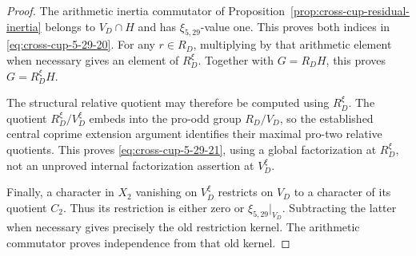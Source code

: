 \begin{proof}
The arithmetic inertia commutator of
Proposition~\ref{prop:cross-cup-residual-inertia} belongs
to \(V_D\cap H\) and has \(\xi_{5,29}\)-value one.
This proves both indices in \eqref{eq:cross-cup-5-29-20}.
For any \(r\in R_D\), multiplying by that arithmetic
element when necessary gives an element of \(R_D^\xi\).
Together with \(G=R_DH\), this proves \(G=R_D^\xi H\).

The structural relative quotient may therefore be
computed using \(R_D^\xi\).
The quotient \(R_D^\xi/V_D^\xi\) embeds into the pro-odd
group \(R_D/V_D\), so the established central coprime
extension argument identifies their maximal pro-two
relative quotients. This proves \eqref{eq:cross-cup-5-29-21}, using a global
factorization at \(R_D^\xi\), not an unproved internal
factorization assertion at \(V_D^\xi\).

Finally, a character in \(X_2\) vanishing on \(V_D^\xi\)
restricts on \(V_D\) to a character of its quotient
\(C_2\).
Thus its restriction is either zero or
\(\xi_{5,29}|_{V_D}\).
Subtracting the latter when necessary gives precisely
the old restriction kernel.
The arithmetic commutator proves independence from
that old kernel.
\end{proof}
